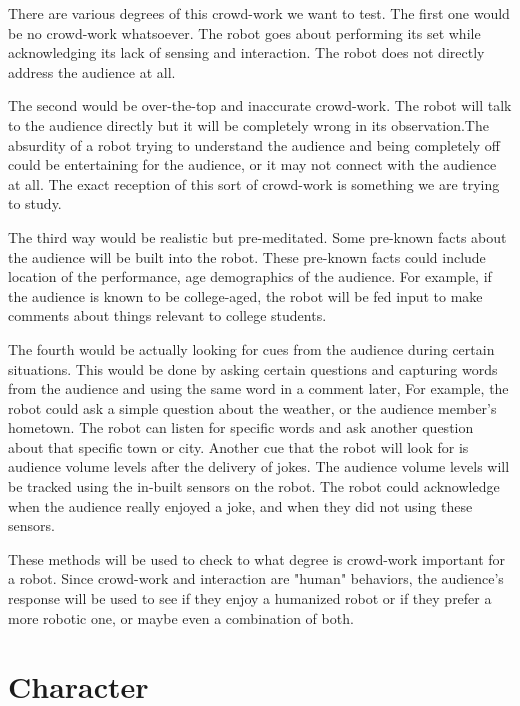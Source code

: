 \documentclass[onecolumn, draftclsnofoot,10pt, compsoc]{IEEEtran}
\begin{document}
There are various degrees of this crowd-work we want to test. The first one would be no crowd-work whatsoever. The robot goes about performing its set while acknowledging its lack of sensing and interaction. The robot does not directly address the audience at all.

The second would be over-the-top and inaccurate crowd-work. The robot will talk to the audience directly but it will be completely wrong in its observation.The absurdity of a robot trying to understand the audience and being completely off could be entertaining for the audience, or it may not connect with the audience at all. The exact reception of this sort of crowd-work is something we are trying to study.

The third way would be realistic but pre-meditated. Some pre-known facts about the audience will be built into the robot. These pre-known facts could include location of the performance, age demographics of the audience. For example, if the audience is known to be college-aged, the robot will be fed input to make comments about things relevant to college students.

The fourth would be actually looking for cues from the audience during certain situations. This would be done by asking certain questions and capturing words from the audience and using the same word in a comment later,  For example, the robot could ask a simple question about the weather, or the audience member's hometown. The robot can listen for specific words and ask another question about that specific town or city. Another cue that the robot will look for is audience volume levels after the delivery of jokes. The audience volume levels will be tracked using the in-built sensors on the robot. The robot could acknowledge when the audience really enjoyed a joke, and when they did not using these sensors.

These methods will be used to check to what degree is crowd-work important for a robot. Since crowd-work and interaction are "human" behaviors, the audience's response will be used to see if they enjoy a humanized robot or if they prefer a more robotic one, or maybe even a combination of both.


\section{Character}
\end{document}
